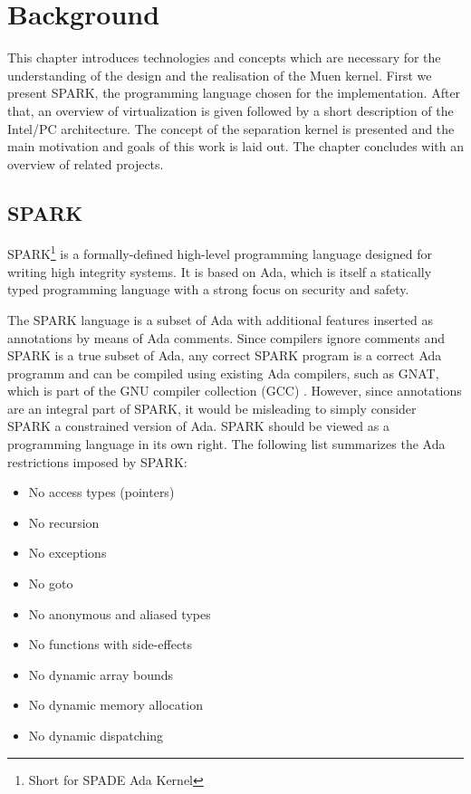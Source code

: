 \chapter{Background}
This chapter introduces technologies and concepts which are necessary for the
understanding of the design and the realisation of the Muen kernel.
First we present SPARK, the programming language chosen for the implementation.
After that, an overview of virtualization is given followed by a short
description of the Intel/PC architecture. The concept of the separation kernel
is presented and the main motivation and goals of this work is laid out. The
chapter concludes with an overview of related projects.

\section{SPARK}
SPARK\footnote{Short for SPADE Ada Kernel} is a formally-defined high-level
programming language designed for writing high integrity systems. It is based on
Ada, which is itself a statically typed programming language with a strong focus
on security and safety.

The SPARK language is a subset of Ada with additional features inserted as
annotations by means of Ada comments. Since compilers ignore comments and SPARK
is a true subset of Ada, any correct SPARK program is a correct Ada programm and
can be compiled using existing Ada compilers, such as GNAT, which is part of the
GNU compiler collection (GCC) \cite{gcc}. However, since annotations are an
integral part of SPARK, it would be misleading to simply consider SPARK a
constrained version of Ada. SPARK should be viewed as a programming language in
its own right. The following list summarizes the Ada restrictions imposed by
SPARK:

\begin{itemize}
	\item No access types (pointers)
	\item No recursion
	\item No exceptions
	\item No goto
	\item No anonymous and aliased types
	\item No functions with side-effects
	\item No dynamic array bounds
	\item No dynamic memory allocation
	\item No dynamic dispatching
\end{itemize}

